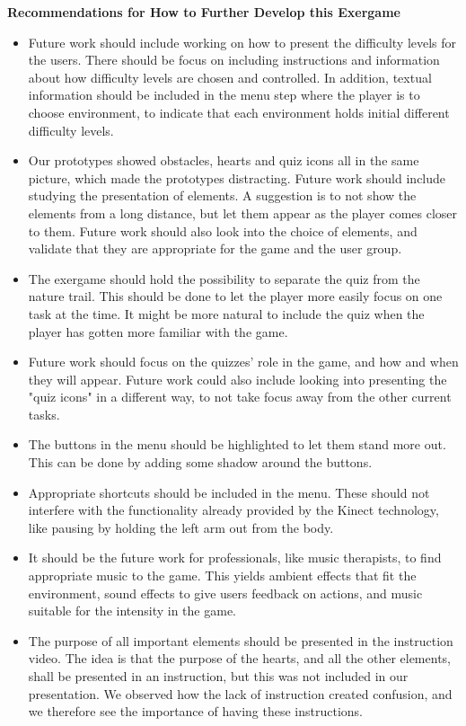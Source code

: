 \textbf{Recommendations for How to Further Develop this Exergame}
\begin{itemize}
\renewcommand{\labelitemi}{$\bullet$}
\item Future work should include working on how to present the difficulty levels for the users. There should be focus on including instructions and information about how difficulty levels are chosen and controlled. In addition, textual information should be included in the menu step where the player is to choose environment, to indicate that each environment holds initial different difficulty levels.  
\item Our prototypes showed obstacles, hearts and quiz icons all in the same picture, which made the prototypes distracting. Future work should include studying the presentation of elements. A suggestion is to not show the elements from a long distance, but let them appear as the player comes closer to them. Future work should also look into the choice of elements, and validate that they are appropriate for the game and the user group. 
\item The exergame should hold the possibility to separate the quiz from the nature trail. This should be done to let the player more easily focus on one task at the time. It might be more natural to include the quiz when the player has gotten more familiar with the game.
\item Future work should focus on the quizzes' role in the game, and how and when they will appear. Future work could also include looking into presenting the "quiz icons" in a different way, to not take focus away from the other current tasks. 
\item The buttons in the menu should be highlighted to let them stand more out. This can be done by adding some shadow around the buttons.
\item Appropriate shortcuts should be included in the menu. These should not interfere with the functionality already provided by the Kinect technology, like pausing by holding the left arm out from the body.
\item It should be the future work for professionals, like music therapists, to find appropriate music to the game. This yields ambient effects that fit the environment, sound effects to give users feedback on actions, and music suitable for the intensity in the game.  
\item The purpose of all important elements should be presented in the instruction video. The idea is that the purpose of the hearts, and all the other elements, shall be presented in an instruction, but this was not included in our presentation. We observed how the lack of instruction created confusion, and we therefore see the importance of having these instructions.  

\end{itemize}
